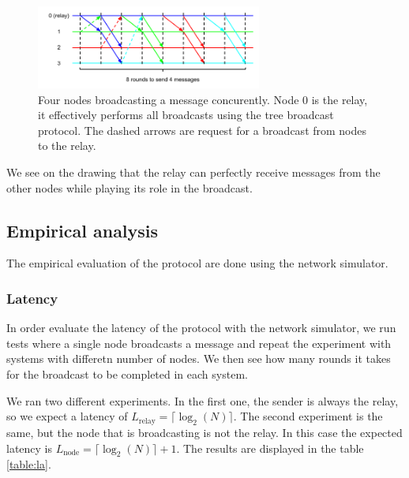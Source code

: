 \documentclass[a4paper]{article}
\begin{document}
\begin{figure}[h]
    \centering
    \includegraphics[width=280px]{Throughput.png}
    \caption{Four nodes broadcasting a message concurently. Node 0 is the relay, it effectively performs all broadcasts using the tree broadcast protocol. The dashed arrows are request for a broadcast from nodes to the relay.}
    \label{figure:throughput}
\end{figure}

We see on the drawing that the relay can perfectly receive messages from the
other nodes while playing its role in the broadcast.

\subsection{Empirical analysis}
The empirical evaluation of the protocol are done using the network simulator.

\subsubsection*{Latency}
In order evaluate the latency of the protocol with the network simulator, we
run tests where a single node broadcasts a message and repeat the experiment
with systems with differetn number of nodes. We then see how many rounds it
takes for the broadcast to be completed in each system.

We ran two different experiments. In the first one, the sender is always the
relay, so we expect a latency of $L_{\text{relay}} = \lceil\log_2(N)\rceil$.
The second experiment is the same, but the node that is broadcasting is not
the relay. In this case the expected latency is
$L_{\text{node}} = \lceil\log_2(N)\rceil + 1$. The results are displayed in
the table \ref{table:la}.
\end{document}
